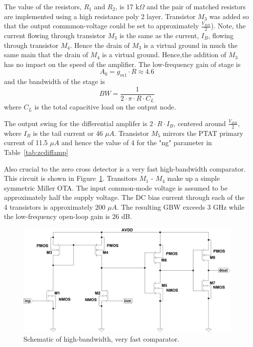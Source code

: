 \documentclass[12pt,oneside,final]{siuethesis}
\theoremstyle{definition}
\begin{document}
The value of the resistors, $R_1$ and $R_2$, is 17 k$\Omega$ and the pair of matched resistors are implemented using a high resistance poly 2 layer. Transistor $M_3$ was added so that the output commmon-voltage could be set to approximately $\frac{V_{DD}}{2}$). Note, the current flowing through transistor $M_3$ is the same as the current, $I_B$, flowing through transistor $M_4$. Hence the drain of $M_3$ is a virtual ground in much the same main that the drain of $M_4$ is a virtual ground. Hence,the addition of $M_3$ has no impact on the speed of the amplifier. The low-frequency gain of stage is
\begin{equation}
A_0 = g_{m1} \cdot R \approx 4.6
\end{equation}
and the bandwidth of the stage is 
\begin{equation}
BW = \frac{1}{2 \cdot \pi \cdot R \cdot C_L}
\end{equation}
where $C_L$ is the total capacitive load on the output node. 
\par The output swing for the differential amplifer is $ 2 \cdot R \cdot I_B$, centered around $\frac{V_{DD}}{2}$, where $I_B$ is the tail current or 46 $\mu A$.  Transistor $M_5$ mirrors the PTAT primary current of 11.5 $\mu A$ and hence the value of 4 for the "ng" parameter in Table~\ref{tab:zcdiffamp}
\par Also crucial to the zero cross detector is a very fast high-bandwidth comparator. This circuit is shown in Figure~\ref{fig:zccomp}. Transitors $M_1$ - $M_4$ make up a simple symmetric Miller OTA. The input common-mode voltage is assumed to be approximately half the supply voltage. The DC bias current through each of the 4 transistors is approximately 200 $\mu A$.  The resulting GBW exceeds 3 GHz while the low-frequency open-loop gain is 26 dB.  

\begin{figure}[htbp!]
	\centering
 	\includegraphics[scale=0.6,keepaspectratio=true]{../Design_Reports/CFD_circuit_report/images/zc_cmp.pdf}
 	\caption{Schematic of high-bandwidth, very fast comparator.}
 	\label{fig:zccomp}
\end{figure}
\end{document}
